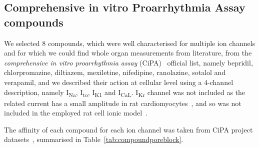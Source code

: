 \subsection{Comprehensive in vitro Proarrhythmia Assay compounds}\label{sec:ch6cipa_compounds}
We selected $8$ compounds, which were well characterised for multiple ion channels and for which we could find whole organ measurements from literature, from the \textit{comprehensive in vitro proarrhythmia assay} (\acs{CiPA})~\cite{Park:2019} official list, namely bepridil, chlorpromazine, diltiazem, mexiletine, nifedipine, ranolazine, sotalol and verapamil, and we described their action at cellular level using a 4-channel description, namely I\textsubscript{Na}, I\textsubscript{to}, I\textsubscript{K1} and I\textsubscript{CaL}. I\textsubscript{Kr} channel was not included as the related current has a small amplitude in rat cardiomyocytes~\cite{Wymore:1997}, and so was not included in the employed rat cell ionic model~\cite{Gattoni:2017}.

\vspace{0.2cm}
The affinity of each compound for each ion channel was taken from CiPA project datasets~\cite{Li:2018, Li:2019}, summarised in Table~\ref{tab:compoundporeblock}.

